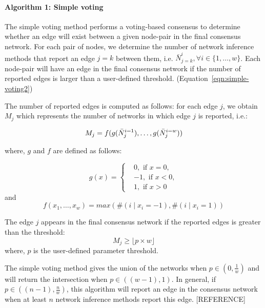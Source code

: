   \paragraph*{Algorithm 1: Simple voting}
  The simple voting method performs a voting-based consensus to determine whether an edge will exist between a given node-pair in the final consensus network.
  For each pair of nodes, we determine the number of network inference methods that report an edge $j=k$ between them, i.e. $\bar{N}^{i}_{j=k}, \forall i \in \{1,\dots,w\}$.
  Each node-pair will have an edge in the final consensus network if the number of reported edges is larger than a user-defined threshold.
  (Equation~\ref{eqn:simple-voting2})

 The number of reported edges is computed as follows: for each edge $j$, we obtain $M_j$ which represents the number of networks in which edge $j$ is reported, i.e.:

  \begin{equation}
      M_j = f(g(\bar{N}^{i=1}_j), \dots, g(\bar{N}^{i=w}_j)) \\
    \label{eq:simple-voting}
  \end{equation}

where, $g$ and $f$ are defined as follows:

  \begin{equation*}
    g(x) =
    \begin{cases}
       & 0, \text{ if } x=0, \\
       & -1, \text{ if } x<0, \\
       & 1, \text{ if } x>0
    \end{cases}
  \end{equation*}
  and
  \begin{equation*}
    f(x_1,\dots,x_w) = max \left( \#(i \mid x_i=-1),\#(i \mid x_i=1)
       \right)
  \end{equation*}

 The edge $j$ appears in the final consensus network if the reported edges is greater than the threshold:
  \begin{equation}
     M_j \geq \lfloor p \times w \rfloor
    \label{eqn:simple-voting2}
  \end{equation}
  where,
  $p$ is the user-defined parameter threshold.

  The simple voting method gives the union of the networks when $p \in (0, \frac{1}{w})$ and will return the intersection when $p \in ((w - 1), 1)$.
  In general, if $p \in ((n - 1), \frac{n}{w})$, this algorithm will report an edge in the consensus network when at least $n$ network inference methods report this edge. [REFERENCE]


